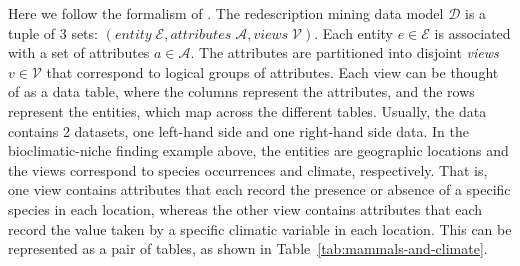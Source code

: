 \begin{table}[tb]
    \caption{An example dataset, represented as a pair of data tables with mapped rows. The left-hand side table records occurrences of various species, while the right-hand side table records the values of various bio-climatic variables such as temperature (T, in \si{\degreeCelsius{}}) and precipitation (P, in \si{\milli\meter}).}
    \label{tab:mammals-and-climate}
\end{table}


Here we follow the formalism of \cite{Galbrun-Methods}.
The redescription mining data model $\mathcal{D}$ is a tuple of 3 sets: $\left( entity\;\mathcal{E}, attributes\;\mathcal{A}, views\;\mathcal{V} \right)$.
Each entity $e \in \mathcal{E}$ is associated with a set of attributes $a \in \mathcal{A}$.
The attributes are partitioned into disjoint \emph{views} $v \in \mathcal{V}$ that correspond to logical groups of attributes. Each view can be thought of as a data table, where the columns represent the attributes, and the rows represent the entities, which map across the different tables.
Usually, the data contains 2 datasets, one left-hand side and one right-hand side data.
In the bioclimatic-niche finding example above, the entities are geographic locations and the views correspond to species occurrences and climate, respectively.
That is, one view contains attributes that each record the presence or absence of a specific species in each location, whereas the other view contains attributes that each record the value taken by a specific climatic variable in each location.
This can be represented as a pair of tables, as shown in Table~\ref{tab:mammals-and-climate}.

